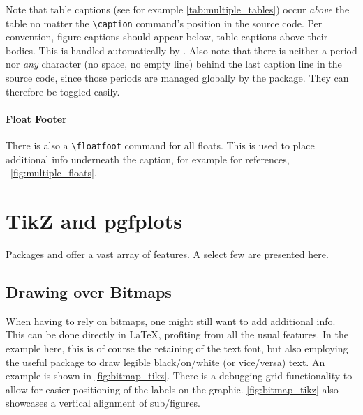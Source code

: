 Note that table captions (see for example \cref{tab:multiple_tables}) occur
\emph{above} the table no matter the \verb|\caption| command's position in
the source code.
Per convention, figure captions should appear below, table captions above their bodies.
This is handled automatically by .
Also note that there is neither a period nor \emph{any} character
(no space, no empty line) behind the last caption line in the source code,
since those periods are managed globally by the  package.
They can therefore be toggled easily.

\paragraph{Float Footer}
There is also a \verb|\floatfoot| command for all floats.
This is used to place additional info underneath the caption, for example for
references, \ \cref{fig:multiple_floats}.

\section{TikZ and pgfplots}
Packages  and  offer a vast array of features.
A select few are presented here.

\subsection{Drawing over Bitmaps}

When having to rely on bitmaps, one might still want to add additional info.
This can be done directly in \LaTeX{}, profiting from all the usual features.
In the example here, this is of course the retaining of the text font, but also
employing the useful  package to draw legible black\-/on\-/white
(or vice\-/versa) text.
An example is shown in \cref{fig:bitmap_tikz}.
There is a debugging grid functionality to allow for easier positioning of the labels
on the graphic.
\cref{fig:bitmap_tikz} also showcases a vertical alignment of sub\-/figures.

